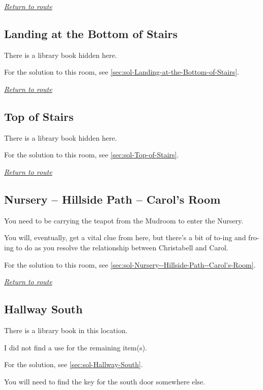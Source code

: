 \documentclass[a5paper]{extarticle}
\begin{document}
\hyperref[sec:route-5]{\emph{Return to route}}

\newpage
\subsection{Landing at the Bottom of Stairs}\label{sec:req-Landing-at-the-Bottom-of-Stairs}

There is a library book hidden here.

For the solution to this room, see \cref{sec:sol-Landing-at-the-Bottom-of-Stairs}.

\hyperref[sec:route-5]{\emph{Return to route}}

\newpage
\subsection{Top of Stairs}\label{sec:req-Top-of-Stairs}

There is a library book hidden here.

For the solution to this room, see \cref{sec:sol-Top-of-Stairs}.

\hyperref[sec:route-5]{\emph{Return to route}}

\newpage
\subsection{Nursery -- Hillside Path -- Carol's Room}\label{sec:req-Nursery--Hillside-Path--Carol's-Room}

You need to be carrying the teapot from the Mudroom to enter the Nursery.

You will, eventually, get a vital clue from here,
but there's a bit of to-ing and fro-ing to do as you resolve the relationship
between Christabell and Carol.

For the solution to this room, see \cref{sec:sol-Nursery--Hillside-Path--Carol's-Room}.

\hyperref[sec:route-5]{\emph{Return to route}}

\newpage
\subsection{Hallway South}\label{sec:req-Hallway-South}

There is a library book in this location.

I did not find a use for the remaining item(s).

For the solution, see \cref{sec:sol-Hallway-South}.

You will need to find the key for the south door somewhere else.
\end{document}
